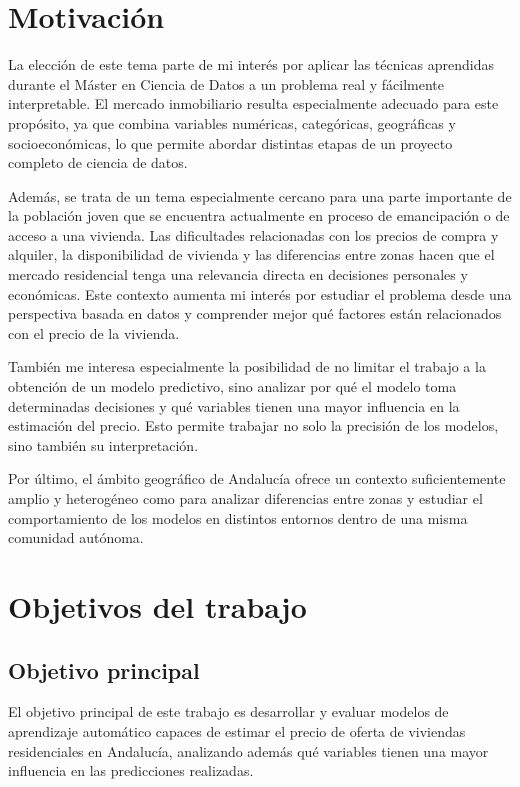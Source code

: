 \documentclass[IB]{TFUOC}%
\begin{document}
\section{Motivación}

La elección de este tema parte de mi interés por aplicar las técnicas aprendidas durante el Máster en Ciencia de Datos a un problema real y fácilmente interpretable. El mercado inmobiliario resulta especialmente adecuado para este propósito, ya que combina variables numéricas, categóricas, geográficas y socioeconómicas, lo que permite abordar distintas etapas de un proyecto completo de ciencia de datos.

Además, se trata de un tema especialmente cercano para una parte importante de la población joven que se encuentra actualmente en proceso de emancipación o de acceso a una vivienda. Las dificultades relacionadas con los precios de compra y alquiler, la disponibilidad de vivienda y las diferencias entre zonas hacen que el mercado residencial tenga una relevancia directa en decisiones personales y económicas. Este contexto aumenta mi interés por estudiar el problema desde una perspectiva basada en datos y comprender mejor qué factores están relacionados con el precio de la vivienda.

También me interesa especialmente la posibilidad de no limitar el trabajo a la obtención de un modelo predictivo, sino analizar por qué el modelo toma determinadas decisiones y qué variables tienen una mayor influencia en la estimación del precio. Esto permite trabajar no solo la precisión de los modelos, sino también su interpretación.

Por último, el ámbito geográfico de Andalucía ofrece un contexto suficientemente amplio y heterogéneo como para analizar diferencias entre zonas y estudiar el comportamiento de los modelos en distintos entornos dentro de una misma comunidad autónoma.

\section{Objetivos del trabajo}

\subsection{Objetivo principal}

El objetivo principal de este trabajo es desarrollar y evaluar modelos de aprendizaje automático capaces de estimar el precio de oferta de viviendas residenciales en Andalucía, analizando además qué variables tienen una mayor influencia en las predicciones realizadas.
\end{document}
